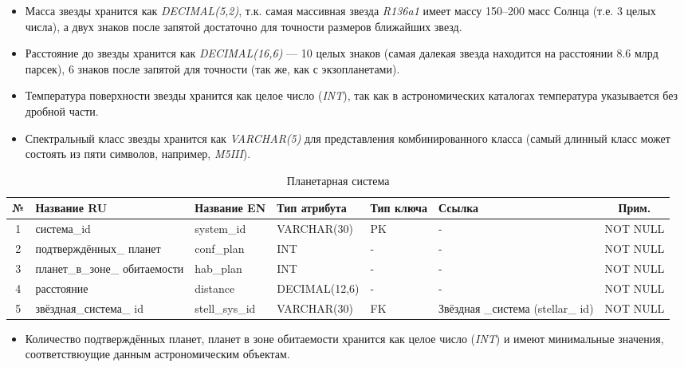 \documentclass[14pt,a4paper]{extarticle}
\begin{document}
	\begin{itemize}
		\item Масса звезды хранится как \textit{DECIMAL(5,2)}, т.к. самая массивная звезда \textit{R136a1} имеет массу 150--200 масс Солнца (т.е. 3 целых числа), а двух знаков после запятой достаточно для точности размеров ближайших звезд.
		\item Расстояние до звезды хранится как \textit{DECIMAL(16,6)} --- 10 целых знаков (самая далекая звезда находится на расстоянии 8.6 млрд парсек), 6 знаков после запятой для точности (так же, как с экзопланетами).
		\item Температура поверхности звезды хранится как целое число (\textit{INT}), так как в
	астрономических каталогах температура указывается без дробной части.
		\item Спектральный класс звезды хранится как \textit{VARCHAR(5)} для представления
	комбинированного класса (самый длинный класс может состоять из пяти символов, например, \textit{M5III}).
	\end{itemize}

	\begin{table}[H]
    \centering
    \caption{Планетарная система}
    \small
\begin{tabular}{|c|p{3.2cm}|p{2.6cm}|p{2.8cm}|p{1.5cm}|p{1.5cm}|c|}
\hline
№ & Название RU & Название EN & Тип атрибута & Тип ключа & Ссылка & Прим. \\
\hline
1 & система\_id & system\_id & VARCHAR(30) & PK & - & NOT NULL \\
2 & подтверждённых\_ планет & conf\_plan & INT & - & - & NOT NULL \\
3 & планет\_в\_зоне\_ обитаемости & hab\_plan & INT & - & - & NOT NULL \\
4 & расстояние & distance & DECIMAL(12,6) & - & - & NOT NULL \\
5 & звёздная\_система\_ id & stell\_sys\_id & VARCHAR(30) & FK & Звёздная \_система (stellar\_ id) & NOT NULL \\
\hline
\end{tabular}
\end{table}

	\begin{itemize}
		\item Количество подтверждённых планет, планет в зоне обитаемости хранится как целое число (\textit{INT}) и имеют минимальные значения, соответствюущие данным астрономическим объектам.
	\end{itemize}
\end{document}
